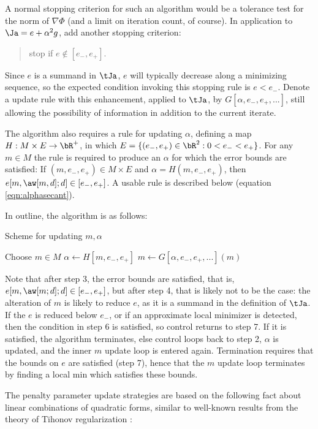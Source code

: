 A normal stopping criterion for such an algorithm would be a tolerance
test for the norm of $\nabla \Phi$ (and a limit on iteration count, of
course). In application to $\Ja = e + \alpha^2 g$, add another
stopping criterion:
\begin{quote}
  stop if $e \notin [e_-,e_+]$.
\end{quote}
Since $e$ is a summand in $\tJa$, $e$ will typically decrease along a
minimizing sequence, so the expected condition invoking this stopping
rule is $e<e_-$. Denote a update rule with this enhancement,
applied to $\tJa$, by $G[\alpha,e_-,e_+,...]$, still allowing the
possibility of information in addition to the current iterate.

The algorithm also requires a rule for updating $\alpha$, defining a map $H: M \times E
\rightarrow \bR^+$, in which $E=\{(e_-,e_+) \in \bR^2: 0 < 
e_-<e_+\}$. For any $m \in M$ the rule is required to produce an $\alpha$ for which
the error bounds are satisfied: If $(m, e_-, e_+) \in M \times E$ and $\alpha = H(m, e_-,
e_+)$, then $e[m,\aw[m,d];d] \in [e_-,e_+]$. A usable rule is
described below (equation \ref{eqn:alphasecant}).

In outline, the algorithm is as follows:
\begin{algorithm}[H]
\caption{Scheme for updating $m, \alpha$}
\begin{algorithmic}[1]
  \State Choose $m\in M$
  \Repeat
  \State $\alpha \gets H[m,e_-,e_+]$
  \Repeat
  \State $m \gets G[\alpha,e_-,e_+,...](m)$
\end{algorithmic}
\end{algorithm}
Note that after step 3, the error bounds are satisfied, that is,
$e[m,\aw[m;d];d] \in [e_-,e_+]$, but after step 4, that is likely not
to be the case: the alteration of $m$ is likely to reduce $e$, as it is a
summand in the definition of $\tJa$. If the $e$ is reduced below
$e_-$, or if an approximate local minimizer is detected, then the condition in step 6 is satisfied, so control returns
to step 7. If it is satisfied, the algorithm terminates, else
control loops back to step 2, $\alpha$ is updated, and the inner $m$
update loop is entered again. Termination requires that the bounds on
$e$ are satisfied (step 7), hence that the $m$ update loop terminates
by finding a local min which satisfies these bounds. 

The penalty parameter update strategies are based on the following fact about linear combinations of quadratic forms, similar to well-known results from the theory of Tihonov regularization \cite[]{Hanke:17}:

